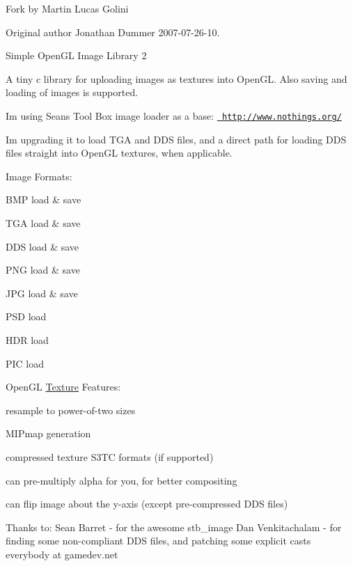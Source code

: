 Fork by Martin Lucas Golini

Original author Jonathan Dummer 2007-\/07-\/26-\/10.

Simple Open\+GL Image Library 2

A tiny c library for uploading images as textures into Open\+GL. Also saving and loading of images is supported.

I\textquotesingle{}m using Sean\textquotesingle{}s Tool Box image loader as a base\+: \href{http://www.nothings.org/}{\texttt{ http\+://www.\+nothings.\+org/}}

I\textquotesingle{}m upgrading it to load TGA and DDS files, and a direct path for loading DDS files straight into Open\+GL textures, when applicable.

Image Formats\+:
\begin{DoxyItemize}
\item BMP load \& save
\item TGA load \& save
\item DDS load \& save
\item PNG load \& save
\item JPG load \& save
\item PSD load
\item HDR load
\item PIC load
\end{DoxyItemize}

Open\+GL \mbox{\hyperlink{struct_texture}{Texture}} Features\+:
\begin{DoxyItemize}
\item resample to power-\/of-\/two sizes
\item MIPmap generation
\item compressed texture S3\+TC formats (if supported)
\item can pre-\/multiply alpha for you, for better compositing
\item can flip image about the y-\/axis (except pre-\/compressed DDS files)
\end{DoxyItemize}

Thanks to\+: Sean Barret -\/ for the awesome stb\+\_\+image Dan Venkitachalam -\/ for finding some non-\/compliant DDS files, and patching some explicit casts everybody at gamedev.\+net 